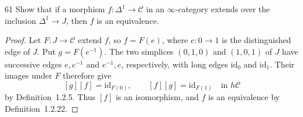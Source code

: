 \begin{exercise}{61}
Show that if a morphism $f\colon\Delta^1\to\mathcal C$ in an $\infty$-category extends over the
inclusion $\Delta^1\to J$, then $f$ is an equivalence.

\begin{proof}
Let $F\colon J\to\mathcal C$ extend $f$, so $f=F(e)$,
where $e\colon0\to1$ is the distinguished edge of $J$.
Put $g=F(e^{-1})$.
The two simplices $(0,1,0)$ and $(1,0,1)$ of $J$
have successive edges $e,e^{-1}$ and $e^{-1},e$,
respectively, with long edges $\mathrm{id}_0$ and $\mathrm{id}_1$.
Their images under $F$ therefore give
\[
 [g][f]=\mathrm{id}_{F(0)},\qquad
 [f][g]=\mathrm{id}_{F(1)}
 \quad\text{in }h\mathcal C
\]
by Definition~1.2.5.
Thus $[f]$ is an isomorphism, and $f$ is an equivalence
by Definition~1.2.22.
\end{proof}
\end{exercise}
